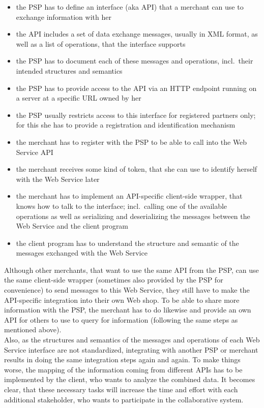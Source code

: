 \begin{itemize}
  \item the \gls{PSP} has to define an interface (aka \gls{API}) that a merchant can use to exchange information with her
  \item the \gls{API} includes a set of data exchange messages, usually in \gls{XML} format, as well as a list of operations, that the interface supports
  \item the \gls{PSP} has to document each of these messages and operations, incl.\ their intended structures and semantics
  \item the \gls{PSP} has to provide access to the \gls{API} via an \gls{HTTP} endpoint running on a server at a specific \gls{URL} owned by her
  \item the \gls{PSP} usually restricts access to this interface for registered partners only; for this she has to provide a registration and identification mechanism
  \item the merchant has to register with the \gls{PSP} to be able to call into the Web Service \gls{API}
  \item the merchant receives some kind of token, that she can use to identify herself with the Web Service later
  \item the merchant has to implement an \gls{API}-specific client-side wrapper, that knows how to talk to the interface; incl.\ calling one of the available operations as well as serializing and deserializing the messages between the Web Service and the client program
  \item the client program has to understand the structure and semantic of the messages exchanged with the Web Service
\end{itemize}

Although other merchants, that want to use the same \gls{API} from the \gls{PSP}, can use the same client-side wrapper (sometimes also provided by the \gls{PSP} for convenience) to send messages to this Web Service, they still have to make the \gls{API}-specific integration into their own Web shop. To be able to share more information with the \gls{PSP}, the merchant has to do likewise and provide an own \gls{API} for others to use to query for information (following the same steps as mentioned above). \\

Also, as the structures and semantics of the messages and operations of each Web Service interface are not standardized, integrating with another \gls{PSP} or merchant results in doing the same integration steps again and again. To make things worse, the mapping of the information coming from different \gls{API}s has to be implemented by the client, who wants to analyze the combined data.   It becomes clear, that these necessary tasks will increase the time and effort with each additional stakeholder, who wants to participate in the collaborative system. \\


